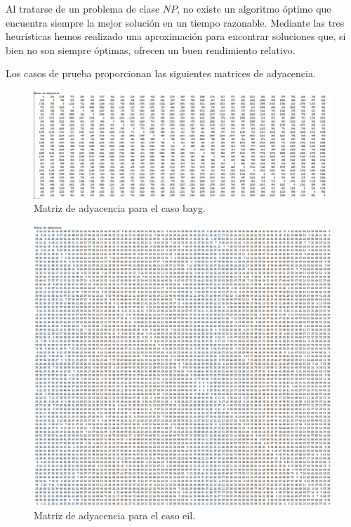 Al tratarse de un problema de clase $NP$, no existe un algoritmo óptimo que encuentra siempre
la mejor solución en un tiempo razonable. Mediante las tres heurísticas hemos realizado una aproximación
para encontrar soluciones que, si bien no son siempre óptimas, ofrecen un buen rendimiento relativo.

Los casos de prueba proporcionan las siguientes matrices de adyacencia. 

\begin{figure}[H]
  \centering
  \includegraphics[scale=0.5]{img/ady-bayg.png}
  \caption{Matriz de adyacencia para el caso bayg.}
\end{figure}

\begin{figure}[H]
  \centering
  \includegraphics[scale=0.5]{img/ady-eil.png}
  \caption{Matriz de adyacencia para el caso eil.}
\end{figure}

